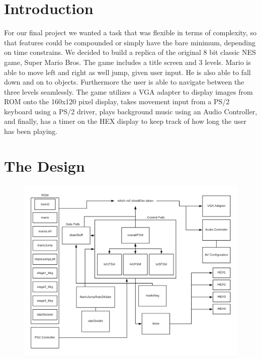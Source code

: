 \documentclass[12pt]{article}
\begin{document}
\begin{titlepage}
 
\end{titlepage}

\section{Introduction}
For our final project we wanted a task that was flexible in terms of complexity, so that features could be compounded or simply have the bare minimum, depending on time constrains. We decided to build a replica of the original 8 bit classic NES game, Super Mario Bros. The game includes a title screen and 3 levels. Mario is able to move left and right as well jump, given user input. He is also able to fall down and on to objects. Furthermore the user is able to navigate between the three levels seamlessly. The game utilizes a VGA adapter to display images from ROM onto the 160x120 pixel display, takes movement input from a PS/2 keyboard using a PS/2 driver, plays background music using an Audio Controller, and finally, has a timer on the HEX display to keep track of how long the user has been playing. 

\section{The Design}

\begin{figure}[h!]
\centering
\includegraphics[width=13.5cm]{schematic.png}
\end{figure}
\end{document}
